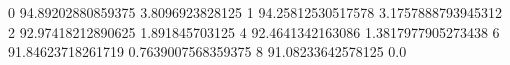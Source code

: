 0 94.89202880859375 3.8096923828125
1 94.25812530517578 3.1757888793945312
2 92.97418212890625 1.891845703125
4 92.4641342163086 1.3817977905273438
6 91.84623718261719 0.7639007568359375
8 91.08233642578125 0.0
